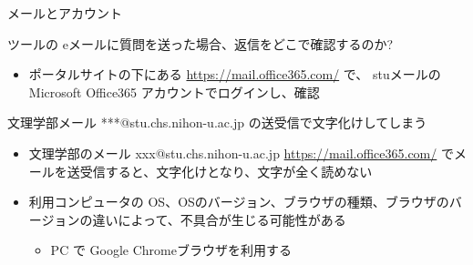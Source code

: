 \documentclass[a4j,10pt]{jsarticle}
\def\lthtmlcheckvsize{\ifdim\ht\sizebox<\vsize 
  \ifdim\wd\sizebox<\hsize\expandafter\hfill\fi \expandafter\vfill
  \else\expandafter\vss\fi}%
\begin{document}
{\begin{frame}[label={sec:orgf27b200},fragile]{メールとアカウント}
\begin{block}{ツールの eメールに質問を送った場合、返信をどこで確認するのか?}
\begin{itemize}
\item ポータルサイトの下にある
\url{https://mail.office365.com/}
で、 stuメールの Microsoft Office365 アカウントでログインし、確認
\end{itemize}
\end{block}
\par
\begin{block}{文理学部メール ***@stu.chs.nihon-u.ac.jp の送受信で文字化けしてしまう}
\begin{itemize}
\item 文理学部のメール xxx@stu.chs.nihon-u.ac.jp \url{https://mail.office365.com/} でメールを送受信すると、文字化けとなり、文字が全く読めない
\par
\item 利用コンピュータの OS、OSのバージョン、ブラウザの種類、ブラウザのバージョンの違いによって、不具合が生じる可能性がある
\begin{itemize}
\item PC で Google Chromeブラウザを利用する
\end{itemize}
\end{itemize}
\end{block}
\end{frame}%
\lthtmlfigureZ
\lthtmlcheckvsize\clearpage}
\end{document}
